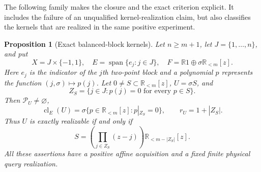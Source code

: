 \documentclass[11pt]{amsart}
\newtheorem{proposition}[theorem]{Proposition}
\theoremstyle{definition}\newtheorem{definition}[theorem]{Definition}
\theoremstyle{remark}\newtheorem{remark}[theorem]{Remark}
\newcommand{\R}{\mathbb R}\newcommand{\N}{\mathbb N}\newcommand{\C}{\mathbb C}
\DeclareMathOperator{\spanop}{span}\DeclareMathOperator{\rank}{rank}
\begin{document}
The following family makes the closure and the exact criterion explicit.
It includes the failure of an unqualified kernel-realization claim, but
also classifies the kernels that are realized in the same positive
experiment.

\begin{proposition}[Exact balanced-block kernels]
\label{prop:block-kernels}
Let $n\ge m+1$, let $J=\{1,\ldots,n\}$, and put
\[
 X=J\times\{-1,1\},\quad E=\spanop\{e_j:j\in J\},\quad
 F=\R1\oplus\sigma\mathbb R_{<m}[z].
\]
Here $e_j$ is the indicator of the $j$th two-point block and a polynomial
$p$ represents the function $(j,\sigma)\mapsto p(j)$. Let
$0\ne S\subset\mathbb R_{<m}[z]$, $U=\sigma S$, and
\[
 Z_S=\{j\in J:p(j)=0\text{ for every }p\in S\}.
\]
Then $\mathcal P_U\ne\varnothing$,
\begin{equation}\label{eq:block-kernel-classification}
 \operatorname{cl}_E(U)
   =\sigma\{p\in\mathbb R_{<m}[z]:p|_{Z_S}=0\},\qquad
 r_U=1+|Z_S|.
\end{equation}
Thus $U$ is exactly realizable if and only if
\begin{equation}\label{eq:block-root-condition}
 S=\left(\prod_{j\in Z_S}(z-j)\right)
                  \mathbb R_{<m-|Z_S|}[z].
\end{equation}
All these assertions have a positive affine acquisition and a fixed
finite physical query realization.
\end{proposition}
\end{document}
